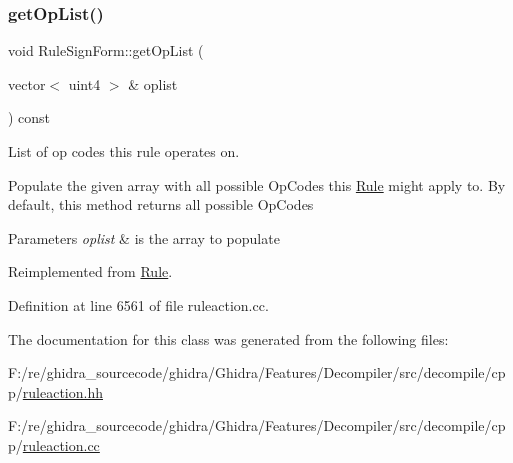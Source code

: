 \subsubsection{\texorpdfstring{getOpList()}{getOpList()}}
{\footnotesize\ttfamily void Rule\+Sign\+Form\+::get\+Op\+List (\begin{DoxyParamCaption}\item[{vector$<$ uint4 $>$ \&}]{oplist }\end{DoxyParamCaption}) const\hspace{0.3cm}{\ttfamily [virtual]}}



List of op codes this rule operates on. 

Populate the given array with all possible Op\+Codes this \mbox{\hyperlink{class_rule}{Rule}} might apply to. By default, this method returns all possible Op\+Codes 
\begin{DoxyParams}{Parameters}
{\em oplist} & is the array to populate \\
\hline
\end{DoxyParams}


Reimplemented from \mbox{\hyperlink{class_rule_a4023bfc7825de0ab866790551856d10e}{Rule}}.



Definition at line 6561 of file ruleaction.\+cc.



The documentation for this class was generated from the following files\+:\begin{DoxyCompactItemize}
\item 
F\+:/re/ghidra\+\_\+sourcecode/ghidra/\+Ghidra/\+Features/\+Decompiler/src/decompile/cpp/\mbox{\hyperlink{ruleaction_8hh}{ruleaction.\+hh}}\item 
F\+:/re/ghidra\+\_\+sourcecode/ghidra/\+Ghidra/\+Features/\+Decompiler/src/decompile/cpp/\mbox{\hyperlink{ruleaction_8cc}{ruleaction.\+cc}}\end{DoxyCompactItemize}
